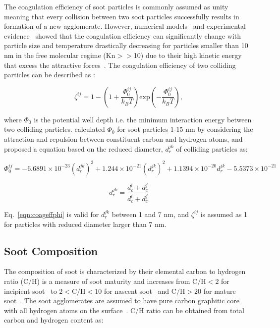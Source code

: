 The coagulation efficiency of soot particles is commonly assumed as unity meaning that every collision between two soot particles successfully results in formation of a new agglomerate. However, numerical models~\citep{narsimhan1985brownian} and experimental evidence~\citep{d2005surface} showed that the coagulation efficiency can significantly change with particle size and temperature drastically decreasing for particles smaller than 10 nm in the free molecular regime (Kn$>>$10) due to their high kinetic energy that excess the attractive forces~\citep{wang1991filtration}. The coagulation efficiency of two colliding particles can be described as \citet{narsimhan1985brownian}:

\begin{equation}
	\zeta^{ij} = 1 - 
	\left(1 + \frac{\Phi^{ij}_0}{k_BT} \right)
	\mathrm{exp}\left(-\frac{\Phi^{ij}_0}{k_BT}\right),
	\label{eqn:coageff}
\end{equation}

\noindent where $\Phi_0$ is the potential well depth i.e. the minimum interaction energy between two colliding particles. \citet{hou2020coagulation} calculated $\Phi_0$ for soot particles 1-15 nm by considering the attraction and repulsion between constituent carbon and hydrogen atoms, and proposed a equation based on the reduced diameter, $d^{jk}_r$ of colliding particles as:

\begin{equation}
	\Phi^{ij}_0 = -6.6891\times10^{-23} (d^{jk}_r)^3 + 1.244\times10^{-21} (d^{jk}_r)^2 + 1.1394\times10^{-20} d^{jk}_r - 5.5373\times10^{-21}
	\label{eqn:coageffphi}
\end{equation}

\begin{equation}
	d^{jk}_r = \frac{d^i_c+d^j_c}{d^i_c+d^j_c}
	\label{eqn:coageffredcueddia}
\end{equation}

Eq.~\eqref{eqn:coageffphi} is valid for $d^{jk}_r$ between 1 and 7 nm, and $\zeta^{ij}$ is assumed as 1 for particles with reduced diameter larger than 7 nm.

\subsection{Soot Composition}
The composition of soot is characterized by their elemental carbon to hydrogen ratio (C/H) is a measure of soot maturity and increases from $\mathrm{C/H<2}$ for incipient soot~\citep{ciajolo1998spectroscopic} to $\mathrm{2<C/H<10}$ for nascent soot~\citep{betrancourt2017investigation} and $\mathrm{C/H>20}$ for mature soot~\citep{michelsen2017probing}. The soot agglomerates are assumed to have pure carbon graphitic core~\citep{kholghy2016core} with all hydrogen atoms on the surface~\citep{blanquart2009analyzing}. C/H ratio can be obtained from total carbon and hydrogen content as:

